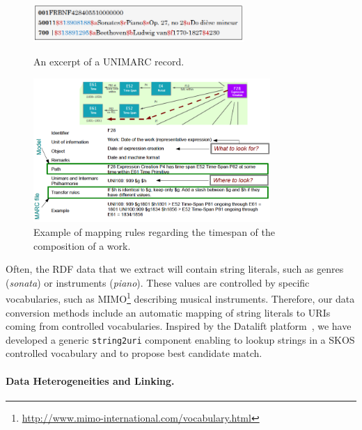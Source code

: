 \documentclass[runningheads,a4paper]{llncs}
\begin{document}
\begin{figure}
  \centering
  \includegraphics[width=8cm]{img/marc-exmpl-simple.png}
  \caption{An excerpt of a UNIMARC record.}
  \label{fig:unimarc}
\smallskip
  \centering
  \includegraphics[width=9cm]{img/mapping-rules.png}
  \caption{Example of mapping rules regarding the timespan of the composition of a work.}
  \label{fig:mappings}
\end{figure}

Often, the RDF data that we extract will contain string literals, such as genres ({\it sonata}) or instruments ({\it piano}). These values are controlled by specific vocabularies, such as MIMO\footnote{\url{http://www.mimo-international.com/vocabulary.html}} describing musical instruments. Therefore, our data conversion methods include an automatic mapping of string literals to URIs coming from controlled vocabularies. Inspired by the Datalift platform~\cite{datalift}, we have developed a generic \texttt{string2uri} component enabling to lookup strings in a SKOS controlled vocabulary and to propose best candidate match.


\paragraph{{\bf Data Heterogeneities and Linking.}}
\end{document}
